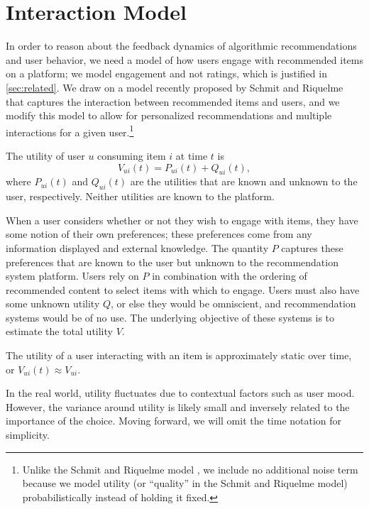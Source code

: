 \documentclass[sigconf]{acmart}
\begin{document}
\section{Interaction Model}
\label{sec:interaction}
In order to reason about the feedback dynamics of algorithmic recommendations and user behavior, we need a model of how users engage with recommended items on a platform; we model engagement and not ratings, which is justified in \cref{sec:related}.
We draw on a model recently proposed by Schmit and Riquelme~\citep{schmit2017human} that captures the interaction between recommended items and users, and we modify this model to allow for personalized recommendations and multiple interactions for a given user.\footnote{Unlike the Schmit and Riquelme model \citep{schmit2017human}, we include no additional noise term because we model utility (or ``quality'' in the Schmit and Riquelme model) probabilistically instead of holding it fixed.}

\begin{definition}
	The utility of user $u$ consuming item $i$ at time $t$ is
\begin{equation}
	V_{ui}(t) =  P_{ui}(t) + Q_{ui}(t),
\end{equation}
where $P_{ui}(t)$ and $Q_{ui}(t)$ are the utilities that are known and unknown to the user, respectively.
Neither utilities are known to the platform.
\end{definition}

\vspace{-3px}
When a user considers whether or not they wish to engage with items, they have some notion of their own preferences; these preferences come from any information displayed and external knowledge.  The quantity $P$ captures these preferences that are known to the user but unknown to the recommendation system platform.  Users rely on $P$ in combination with the ordering of recommended content to select items with which to engage.  Users must also have some unknown utility $Q$, or else they would be omniscient, and recommendation systems would be of no use.  The underlying objective of these systems is to estimate the total utility $V$.

\begin{assumption}
The utility of a user interacting with an item is approximately static over time, or 
$V_{ui}(t) \approx V_{ui}$.
\label{as:static_utility}
\end{assumption}

\vspace{-3px}
In the real world, utility fluctuates due to contextual factors such as user mood.  However, the variance around utility is likely small and inversely related to the importance of the choice.  Moving forward, we will omit the time notation for simplicity.
\end{document}
